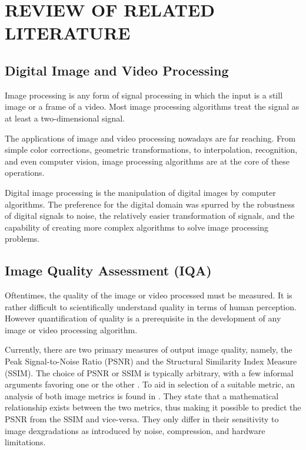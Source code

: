 
\chapter{REVIEW OF RELATED LITERATURE} %

\label{Chapter2} %


\section{Digital Image and Video Processing}
Image processing is any form of signal processing in which the input is a still image or a frame of a video. Most image processing algorithms treat the signal as at least a two-dimensional signal. 

The applications of image and video processing nowadays are far reaching. From simple color corrections, geometric transformations, to interpolation, recognition, and even computer vision, image processing algorithms are at the core of these operations.

Digital image processing is the manipulation of digital images by computer algorithms. The preference for the digital domain was spurred by the robustness of digital signals to noise, the relatively easier transformation of signals, and the capability of creating more complex algorithms to solve image processing problems.


\section{Image Quality Assessment (IQA)}
Oftentimes, the quality of the image or video processed must be measured. 
It is rather difficult to scientifically understand quality in terms of human perception.
However quantification of quality is a prerequisite in the development of any image or video processing algorithm.

Currently, there are two primary measures of output image quality, namely, the Peak Signal-to-Noise Ratio (PSNR) and the Structural Similarity Index Measure (SSIM). 
The choice of PSNR or SSIM is typically arbitrary, with a few informal arguments favoring one or the other \citep{Farsiu2004}.
To aid in selection of a suitable metric, an analysis of both image metrics is found in \cite{Hore2010}. 
They state that a mathematical relationship exists between the two metrics, thus making it possible to predict the PSNR from the SSIM and vice-versa. 
They only differ in their sensitivity to image dexgradations as introduced by noise, compression, and hardware limitations.

